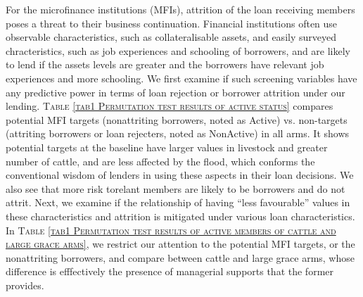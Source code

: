 	For the microfinance institutions (MFIs), attrition of the loan receiving members poses a threat to their business continuation. Financial institutions often use observable characteristics, such as collateralisable assets, and easily surveyed chracteristics, such as job experiences and schooling of borrowers, and are likely to lend if the assets levels are greater and the borrowers have relevant job experiences and more schooling. We first examine if such screening variables have any predictive power in terms of loan rejection or borrower attrition under our lending. \textsc{\normalsize Table \ref{tab1 Permutation test results of active status}} compares potential MFI targets (nonattriting borrowers, noted as \textsf{Active}) vs. non-targets (attriting borrowers or loan rejecters, noted as \textsf{NonActive}) in all arms. It shows potential targets at the baseline have larger values in livestock and greater number of cattle, and are less affected by the flood, which conforms the conventional wisdom of lenders in using these aspects in their loan decisions. We also see that more risk torelant members are likely to be borrowers and do not attrit. Next, we examine if the relationship of having ``less favourable'' values in these characteristics and attrition is mitigated under various loan characteristics. In \textsc{\normalsize Table \ref{tab1 Permutation test results of active members of cattle and large grace arms}}, we restrict our attention to the potential MFI targets, or the nonattriting borrowers, and compare between \textsf{cattle} and \textsf{large grace} arms, whose difference is efffectively the presence of managerial supports that the former provides. \label{PageOfAttrition}%
